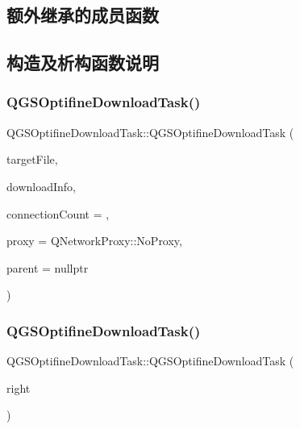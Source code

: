 \subsection*{额外继承的成员函数}


\subsection{构造及析构函数说明}
\mbox{\label{class_q_g_s_optifine_download_task_a478a3b073dcbaeb68337485fcd31f060}} 
\subsubsection{\texorpdfstring{Q\+G\+S\+Optifine\+Download\+Task()}{QGSOptifineDownloadTask()}\hspace{0.1cm}{\footnotesize\ttfamily [1/3]}}
{\footnotesize\ttfamily Q\+G\+S\+Optifine\+Download\+Task\+::\+Q\+G\+S\+Optifine\+Download\+Task (\begin{DoxyParamCaption}\item[{Q\+File $\ast$}]{target\+File,  }\item[{const \mbox{\hyperlink{class_q_g_s_download_info}{Q\+G\+S\+Download\+Info}} \&}]{download\+Info,  }\item[{int}]{connection\+Count = {},  }\item[{const Q\+Network\+Proxy \&}]{proxy = {\ttfamily QNetworkProxy\+:\+:NoProxy},  }\item[{Q\+Object $\ast$}]{parent = {\ttfamily nullptr} }\end{DoxyParamCaption})}

\mbox{\label{class_q_g_s_optifine_download_task_a93ffdc0e6ea8473a7a7de4850ed10638}} 
\subsubsection{\texorpdfstring{Q\+G\+S\+Optifine\+Download\+Task()}{QGSOptifineDownloadTask()}\hspace{0.1cm}{\footnotesize\ttfamily [2/3]}}
{\footnotesize\ttfamily Q\+G\+S\+Optifine\+Download\+Task\+::\+Q\+G\+S\+Optifine\+Download\+Task (\begin{DoxyParamCaption}\item[{const \mbox{\hyperlink{class_q_g_s_optifine_download_task}{Q\+G\+S\+Optifine\+Download\+Task}} \&}]{right }\end{DoxyParamCaption})\hspace{0.3cm}{\ttfamily [delete]}}


